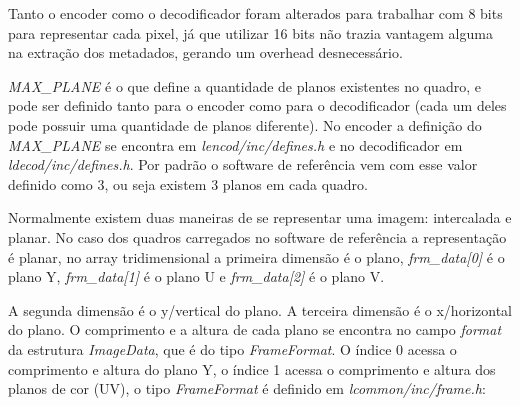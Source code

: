 Tanto o encoder como o decodificador foram alterados para trabalhar com 8 bits para representar cada pixel, já que utilizar 16 bits não trazia vantagem alguma na extração dos metadados, gerando um overhead desnecessário.

\textit{MAX\_PLANE} é o que define a quantidade de planos existentes no quadro, e pode ser definido tanto para o encoder como para o decodificador (cada um deles pode possuir uma quantidade de planos diferente). No encoder a definição do \textit{MAX\_PLANE} se encontra em \textit{lencod/inc/defines.h} e no decodificador em \textit{ldecod/inc/defines.h}. Por padrão o software de referência vem com esse valor definido como 3, ou seja existem 3 planos em cada quadro.

Normalmente existem duas maneiras de se representar uma imagem: intercalada e planar. No caso dos quadros carregados no software de referência a representação é planar, no array tridimensional a primeira dimensão é o plano, \textit{frm\_data[0]} é o plano Y, \textit{frm\_data[1]} é o plano U e \textit{frm\_data[2]} é o plano V.

A segunda dimensão é o y/vertical do plano. A terceira dimensão é o x/horizontal do plano. O comprimento e a altura de cada plano se encontra no campo \textit{format} da estrutura \textit{ImageData}, que é do tipo \textit{FrameFormat}. O índice 0 acessa o comprimento e altura do plano Y, o índice 1 acessa o comprimento e altura dos planos de cor (UV),  o tipo \textit{FrameFormat} é definido em \textit{lcommon/inc/frame.h}:

